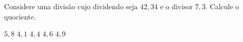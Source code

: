 Considere uma divisão cujo dividendo seja $42{,}34$ e o divisor $7{,}3$. Calcule o quociente.

$5{,}8$
$4{,}1$
$4{,}4$
$4{,}6$
$4{,}9$



